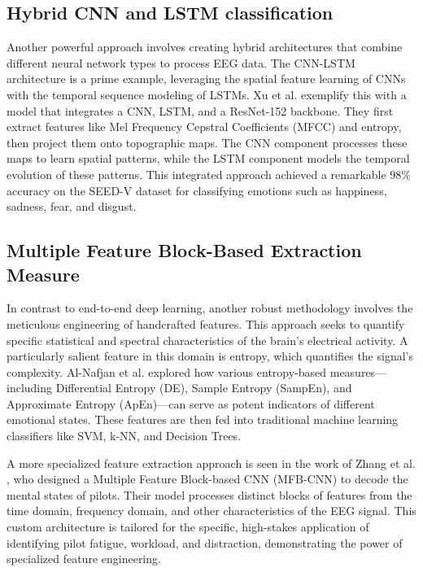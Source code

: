 \documentclass[conference]{IEEEtran}
\begin{document}
\subsection{Hybrid CNN and LSTM classification}
Another powerful approach involves creating hybrid architectures that combine different neural network types to process EEG data. The CNN-LSTM architecture is a prime example, leveraging the spatial feature learning of CNNs with the temporal sequence modeling of LSTMs. Xu et al. \cite{b2} exemplify this with a model that integrates a CNN, LSTM, and a ResNet-152 backbone. They first extract features like Mel Frequency Cepstral Coefficients (MFCC) and entropy, then project them onto topographic maps. The CNN component processes these maps to learn spatial patterns, while the LSTM component models the temporal evolution of these patterns. This integrated approach achieved a remarkable 98\% accuracy on the SEED-V dataset for classifying emotions such as happiness, sadness, fear, and disgust.

\subsection{Multiple Feature Block-Based Extraction Measure}
In contrast to end-to-end deep learning, another robust methodology involves the meticulous engineering of handcrafted features. This approach seeks to quantify specific statistical and spectral characteristics of the brain's electrical activity. A particularly salient feature in this domain is entropy, which quantifies the signal’s complexity. Al-Nafjan et al. \cite{b3} explored how various entropy-based measures—including Differential Entropy (DE), Sample Entropy (SampEn), and Approximate Entropy (ApEn)—can serve as potent indicators of different emotional states. These features are then fed into traditional machine learning classifiers like SVM, k-NN, and Decision Trees.

A more specialized feature extraction approach is seen in the work of Zhang et al. \cite{b4}, who designed a Multiple Feature Block-based CNN (MFB-CNN) to decode the mental states of pilots. Their model processes distinct blocks of features from the time domain, frequency domain, and other characteristics of the EEG signal. This custom architecture is tailored for the specific, high-stakes application of identifying pilot fatigue, workload, and distraction, demonstrating the power of specialized feature engineering.
\end{document}
